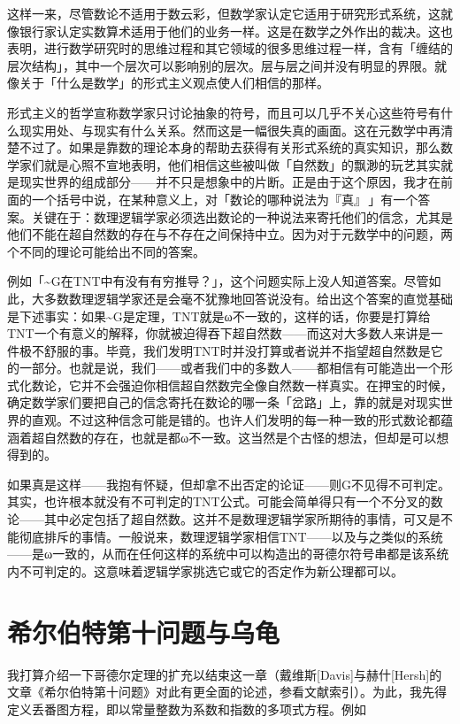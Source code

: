 \documentclass[
  12pt,
  twoside,
  openright,
  oldfontcommands,
]{memoir}
\begin{document}
这样一来，尽管数论不适用于数云彩，但数学家认定它适用于研究形式系统，这就像银行家认定实数算术适用于他们的业务一样。这是在数学之外作出的裁决。这也表明，进行数学研究时的思维过程和其它领域的很多思维过程一样，含有「缠结的层次结构」，其中一个层次可以影响别的层次。层与层之间并没有明显的界限。就像关于「什么是数学」的形式主义观点使人们相信的那样。

形式主义的哲学宣称数学家只讨论抽象的符号，而且可以几乎不关心这些符号有什么现实用处、与现实有什么关系。然而这是一幅很失真的画面。这在元数学中再清楚不过了。如果是靠数的理论本身的帮助去获得有关形式系统的真实知识，那么数学家们就是心照不宣地表明，他们相信这些被叫做「自然数」的飘渺的玩艺其实就是现实世界的组成部分------并不只是想象中的片断。正是由于这个原因，我才在前面的一个括号中说，在某种意义上，对「数论的哪种说法为『真』\,」有一个答案。关键在于：数理逻辑学家必须选出数论的一种说法来寄托他们的信念，尤其是他们不能在超自然数的存在与不存在之间保持中立。因为对于元数学中的问题，两个不同的理论可能给出不同的答案。

例如「\textasciitilde G在TNT中有没有有穷推导？」，这个问题实际上没人知道答案。尽管如此，大多数数理逻辑学家还是会毫不犹豫地回答说没有。给出这个答案的直觉基础是下述事实：如果\textasciitilde G是定理，TNT就是ω不一致的，这样的话，你要是打算给TNT一个有意义的解释，你就被迫得吞下超自然数------而这对大多数人来讲是一件极不舒服的事。毕竟，我们发明TNT时并没打算或者说并不指望超自然数是它的一部分。也就是说，我们------或者我们中的多数人------都相信有可能造出一个形式化数论，它并不会强迫你相信超自然数完全像自然数一样真实。在押宝的时候，确定数学家们要把自己的信念寄托在数论的哪一条「岔路」上，靠的就是对现实世界的直观。不过这种信念可能是错的。也许人们发明的每一种一致的形式数论都蕴涵着超自然数的存在，也就是都ω不一致。这当然是个古怪的想法，但却是可以想得到的。

如果真是这样------我抱有怀疑，但却拿不出否定的论证------则G不见得不可判定。其实，也许根本就没有不可判定的TNT公式。可能会简单得只有一个不分叉的数论------其中必定包括了超自然数。这并不是数理逻辑学家所期待的事情，可又是不能彻底排斥的事情。一般说来，数理逻辑学家相信TNT------以及与之类似的系统------是ω一致的，从而在任何这样的系统中可以构造出的哥德尔符号串都是该系统内不可判定的。这意味着逻辑学家挑选它或它的否定作为新公理都可以。

\section{希尔伯特第十问题与乌龟}

我打算介绍一下哥德尔定理的扩充以结束这一章（戴维斯{[}Davis{]}与赫什{[}Hersh{]}的文章《希尔伯特第十问题》对此有更全面的论述，参看文献索引）。为此，我先得定义丢番图方程，即以常量整数为系数和指数的多项式方程。例如
\end{document}
